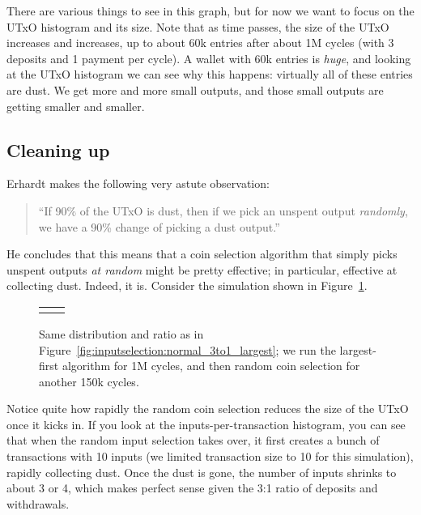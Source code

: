 \documentclass{article}
\theoremstyle{definition}{
  \newtheorem{lemma}{Lemma}[section] %
  \newtheorem{definition}[lemma]{Definition}
}
\theoremstyle{theorem}{
  \newtheorem{invariant}[lemma]{Invariant}
  \newtheorem{proofobligation}[lemma]{Proof Obligation}
}
\numberwithin{equation}{lemma}
\begin{document}
There are various things to see in this graph, but for now we want to focus
on the UTxO histogram and its size. Note that as time passes, the size of the
UTxO increases and increases, up to about 60k entries after about 1M
cycles (with 3 deposits and 1 payment per cycle). A wallet with 60k entries
is \emph{huge}, and looking at the UTxO histogram we can see why this happens:
virtually all of these entries are dust. We get more and more small outputs,
and those small outputs are getting smaller and smaller.

\subsection{Cleaning up}

Erhardt makes the following very astute observation:

\begin{quote}
``If 90\% of the UTxO is dust, then if we pick an unspent output
\emph{randomly}, we have a 90\% change of picking a dust output.''
\end{quote}

He concludes that this means that a coin selection algorithm that simply picks
unspent outputs \emph{at random} might be pretty effective; in particular,
effective at collecting dust. Indeed, it is. Consider the simulation shown in
Figure~\ref{fig:inputselection:normal_3to1_largeThenRandom}.

\begin{figure}[p]
\begin{center}
\scriptsize
\begin{tabular}{ll}
 &

\end{tabular}
\end{center}
\caption{\label{fig:inputselection:normal_3to1_largeThenRandom}
  Same distribution and ratio as in
  Figure~\ref{fig:inputselection:normal_3to1_largest}; we run the largest-first
  algorithm for 1M cycles, and then random coin selection for another 150k
  cycles.
}
\end{figure}

Notice quite how rapidly the random coin selection reduces the size of the UTxO
once it kicks in. If you look at the inputs-per-transaction histogram, you can see
that when the random input selection takes over, it first creates a bunch of
transactions with 10 inputs (we limited transaction size to 10 for this
simulation), rapidly collecting dust. Once the dust is gone, the number of
inputs shrinks to about 3 or 4, which makes perfect sense given the 3:1 ratio of
deposits and withdrawals.
\end{document}
